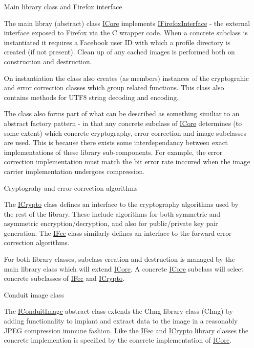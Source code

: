 \begin{DoxyParagraph}{Main library class and Firefox interface}

\end{DoxyParagraph}
The main libray (abstract) class \hyperlink{classefb_1_1ICore}{ICore} implements \hyperlink{classefb_1_1IFirefoxInterface}{IFirefoxInterface} -\/ the external interface exposed to Firefox via the C wrapper code. When a concrete subclass is instantiated it requires a Facebook user ID with which a profile directory is created (if not present). Clean up of any cached images is performed both on construction and destruction.

On instantiation the class also creates (as members) instances of the cryptograhic and error correction classes which group related functions. This class also contains methods for UTF8 string decoding and encoding.

The class also forms part of what can be described as something similiar to an abstract factory pattern -\/ in that any concrete subclass of \hyperlink{classefb_1_1ICore}{ICore} determines (to some extent) which concrete cryptography, error correction and image subclasses are used. This is because there exists some interdependancy between exact implementations of these library sub-\/components. For example, the error correction implementation must match the bit error rate inccured when the image carrier implementation undergoes compression.

\begin{DoxyParagraph}{Cryptograhy and error correction algorithms}

\end{DoxyParagraph}
The \hyperlink{classefb_1_1ICrypto}{ICrypto} class defines an interface to the cryptography algorithms used by the rest of the library. These include algorithms for both symmetric and asymmetric encryption/decryption, and also for public/private key pair generation. The \hyperlink{classefb_1_1IFec}{IFec} class similarly defines an interface to the forward error correction algorithms.

For both library classes, subclass creation and destruction is managed by the main library class which will extend \hyperlink{classefb_1_1ICore}{ICore}. A concrete \hyperlink{classefb_1_1ICore}{ICore} subclass will select concrete subclasses of \hyperlink{classefb_1_1IFec}{IFec} and \hyperlink{classefb_1_1ICrypto}{ICrypto}.

\begin{DoxyParagraph}{Conduit image class}

\end{DoxyParagraph}
The \hyperlink{classefb_1_1IConduitImage}{IConduitImage} abstract class extends the CImg library class (CImg) by adding functionality to implant and extract data to the image in a reasonably JPEG compression immune fashion. Like the \hyperlink{classefb_1_1IFec}{IFec} and \hyperlink{classefb_1_1ICrypto}{ICrypto} library classes the concrete implemention is specified by the concrete implementation of \hyperlink{classefb_1_1ICore}{ICore}. 

